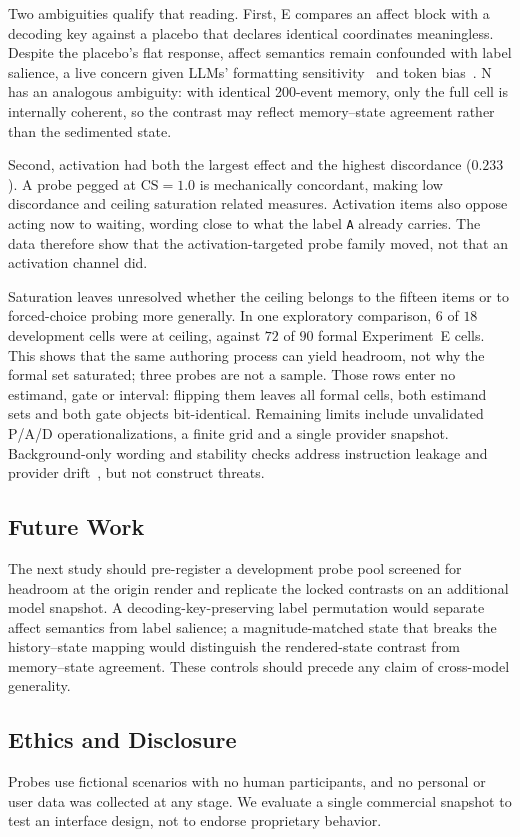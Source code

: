 \documentclass[sigconf]{acmart}
\begin{document}
Two ambiguities qualify that reading. First, E compares an affect block with a decoding key against a placebo that declares identical coordinates meaningless. Despite the placebo's flat response, affect semantics remain confounded with label salience, a live concern given LLMs' formatting sensitivity~\cite{sclar2024quantifying} and token bias~\cite{zhao2021calibrate}. N has an analogous ambiguity: with identical 200-event memory, only the full cell is internally coherent, so the contrast may reflect memory--state agreement rather than the sedimented state.

Second, activation had both the largest effect and the highest discordance ($0.233$). A probe pegged at $\mathrm{CS}{=}1.0$ is mechanically concordant, making low discordance and ceiling saturation related measures. Activation items also oppose acting now to waiting, wording close to what the label \texttt{A} already carries. The data therefore show that the activation-targeted probe family moved, not that an activation channel did.

Saturation leaves unresolved whether the ceiling belongs to the fifteen items or to forced-choice probing more generally. In one exploratory comparison, $6$ of $18$ development cells were at ceiling, against $72$ of $90$ formal Experiment~E cells. This shows that the same authoring process can yield headroom, not why the formal set saturated; three probes are not a sample. Those rows enter no estimand, gate or interval: flipping them leaves all formal cells, both estimand sets and both gate objects bit-identical. Remaining limits include unvalidated P/A/D operationalizations, a finite grid and a single provider snapshot. Background-only wording and stability checks address instruction leakage and provider drift~\cite{chen2024drift}, but not construct threats.

\subsection{Future Work}
The next study should pre-register a development probe pool screened for headroom at the origin render and replicate the locked contrasts on an additional model snapshot. A decoding-key-preserving label permutation would separate affect semantics from label salience; a magnitude-matched state that breaks the history--state mapping would distinguish the rendered-state contrast from memory--state agreement. These controls should precede any claim of cross-model generality.

\subsection{Ethics and Disclosure}
Probes use fictional scenarios with no human participants, and no personal or user data was collected at any stage. We evaluate a single commercial snapshot to test an interface design, not to endorse proprietary behavior.
\end{document}

